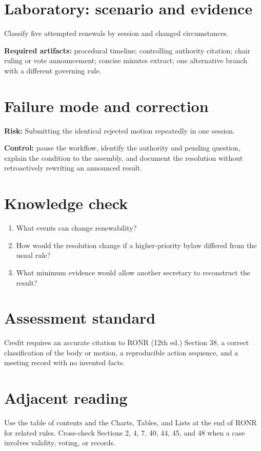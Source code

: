 \documentclass[11pt]{article}
\begin{document}
\section{Laboratory: scenario and evidence}
Classify five attempted renewals by session and changed circumstances.

\textbf{Required artifacts:} procedural timeline; controlling authority citation; chair ruling or vote announcement; concise minutes extract; one alternative branch with a different governing rule.

\section{Failure mode and correction}
\textbf{Risk:} Submitting the identical rejected motion repeatedly in one session.

\textbf{Control:} pause the workflow, identify the authority and pending question, explain the condition to the assembly, and document the resolution without retroactively rewriting an announced result.

\section{Knowledge check}
\begin{enumerate}[leftmargin=*,itemsep=4pt]
\item What events can change renewability?
\item How would the resolution change if a higher-priority bylaw differed from the usual rule?
\item What minimum evidence would allow another secretary to reconstruct the result?
\end{enumerate}

\section{Assessment standard}
Credit requires an accurate citation to RONR (12th ed.) Section 38, a correct classification of the body or motion, a reproducible action sequence, and a meeting record with no invented facts.

\section{Adjacent reading}
Use the table of contents and the Charts, Tables, and Lists at the end of RONR for related rules. Cross-check Sections 2, 4, 7, 40, 44, 45, and 48 when a case involves validity, voting, or records.
\end{document}
